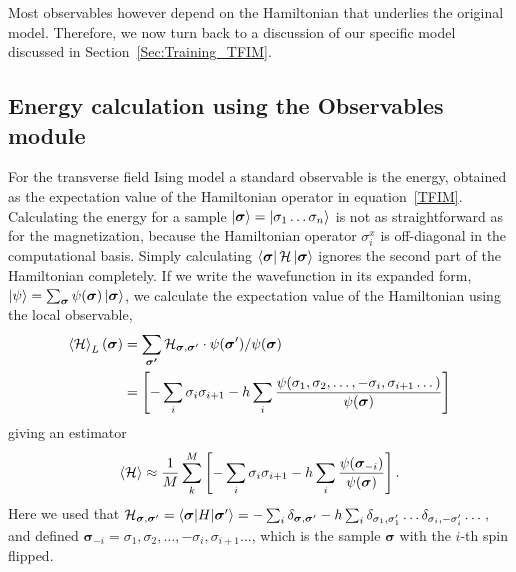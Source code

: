 \documentclass[submission, Phys]{SciPost}
\begin{document}
Most observables however depend on the Hamiltonian that underlies the original model.
Therefore, we now turn back to a discussion of our specific model discussed in 
Section~\ref{Sec:Training_TFIM}.

\subsection{Energy calculation using the Observables module}

For the transverse field Ising model a standard observable is the energy, obtained as the expectation value of
the Hamiltonian operator in equation~\ref{TFIM}.
Calculating the energy for a sample $\ket{\bm{\sigma} }= \ket{\sigma_1 \dots \sigma_n}$ is not as straightforward as for the magnetization,
because the Hamiltonian operator ${\sigma}^x_i$ is off-diagonal in the computational basis.
Simply calculating $\bra{\bm{\sigma} } \mathcal{H} \ket{\bm{\sigma} }$ ignores the second part of the Hamiltonian completely.
If we write the wavefunction in its expanded form, $\ket{\psi} = \sum_{\bm{\sigma}} \psi(\bm{\sigma}) \ket{\bm{\sigma}} $,
we calculate the expectation value of the Hamiltonian using the local observable,
\begin{align}
	\braket{ \mathcal{H}}_L({\bm{\sigma}}) & = \sum_{ \bm{\sigma'}} \mathcal{H}_{\bm{\sigma}, \bm{\sigma}'} \cdot \psi(\bm{\sigma}') / \psi(\bm{\sigma})                                                     \\
	                             & =  \left[ -\sum_i \sigma_i \sigma_{i+1} - h \sum_i \frac{\psi(\sigma_1, \sigma_2, \dots , -\sigma_i, \sigma_{i+1} \dots)}{\psi (\bm{\sigma})} \right]
\end{align}
giving an estimator
\begin{equation}
	\braket{ \mathcal{H}} \approx \frac{1}{M} \sum_k^M \left[ -\sum_i \sigma_i \sigma_{i+1} - h \sum_i \frac{\psi (\bm{\sigma}_{-i})}{\psi (\bm{\sigma})} \right].
\end{equation}
Here we used that $\mathcal{H}_{\bm{\sigma}, \bm{\sigma}'} = \braket{\bm{\sigma} | H | \bm{\sigma}'} = -\sum_i \delta_{\bm{\sigma}, \bm{\sigma}'} - h \sum_i \delta_{\sigma_1, \sigma_1'} \dots \delta_{\sigma_i, -\sigma_i'} \dots$, and defined $\bm{\sigma}_{-i} = \sigma_1, \sigma_2, \dots , -\sigma_i, \sigma_{i+1} \dots$, which is the sample $\bm{\sigma}$ with the $i$-th spin flipped.
\end{document}
